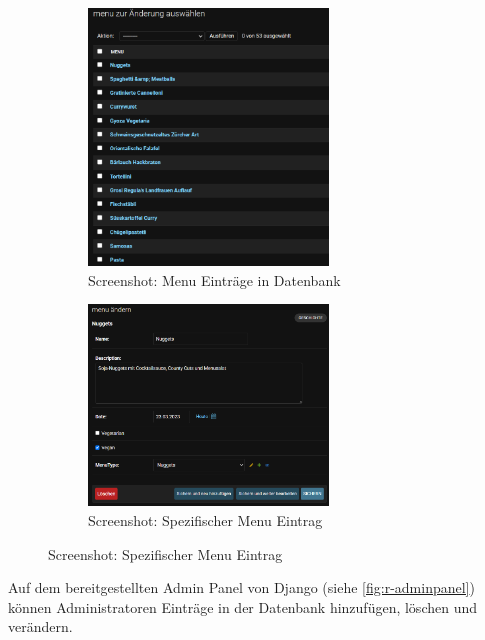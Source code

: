 \begin{figure}[htp]
    \begin{subfigure}[b]{0.5\textwidth}
        \centering
        \includegraphics[width=0.7\textwidth]{images/Resultat-admin-menulist.png}
        \caption{Screenshot: Menu Einträge in Datenbank}
        \label{fig:r-adminpanel-menulist}
    \end{subfigure}
    \begin{subfigure}[b]{0.5\textwidth}
        \centering
        \includegraphics[width=0.7\textwidth]{images/Resultat-admin-menu.png}
        \caption{Screenshot: Spezifischer Menu Eintrag}
        \label{fig:r-adminpanel-menu}
    \end{subfigure}
    \hfill
\end{figure}


Auf dem bereitgestellten Admin Panel von Django (siehe \ref{fig:r-adminpanel})
können Administratoren Einträge in der Datenbank hinzufügen, löschen und
verändern.


